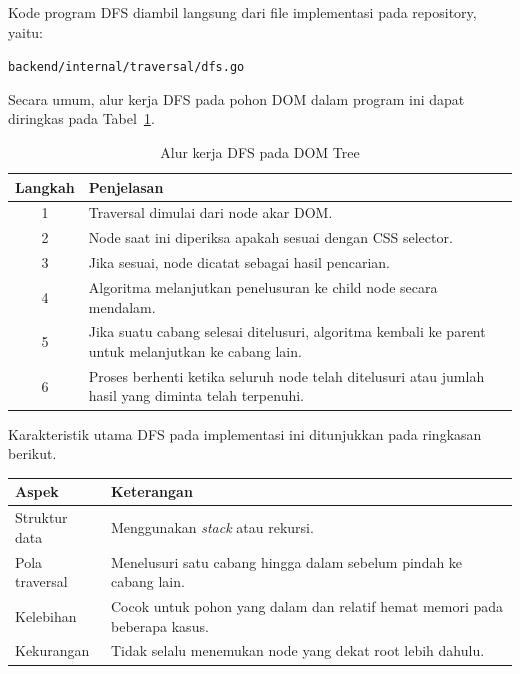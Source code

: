 Kode program DFS diambil langsung dari file implementasi pada repository, yaitu:

\begin{tcolorbox}[colback=gray!10,title=Lokasi File Implementasi DFS]
\texttt{backend/internal/traversal/dfs.go}
\end{tcolorbox}



Secara umum, alur kerja DFS pada pohon DOM dalam program ini dapat diringkas pada Tabel~\ref{tab:alur-dfs}.

\begin{table}[H]
\centering
\caption{Alur kerja DFS pada DOM Tree}
\label{tab:alur-dfs}
\begin{tabular}{|c|p{10cm}|}
\hline
\textbf{Langkah} & \textbf{Penjelasan} \\ \hline
1 & Traversal dimulai dari node akar DOM. \\ \hline
2 & Node saat ini diperiksa apakah sesuai dengan CSS selector. \\ \hline
3 & Jika sesuai, node dicatat sebagai hasil pencarian. \\ \hline
4 & Algoritma melanjutkan penelusuran ke child node secara mendalam. \\ \hline
5 & Jika suatu cabang selesai ditelusuri, algoritma kembali ke parent untuk melanjutkan ke cabang lain. \\ \hline
6 & Proses berhenti ketika seluruh node telah ditelusuri atau jumlah hasil yang diminta telah terpenuhi. \\ \hline
\end{tabular}
\end{table}

Karakteristik utama DFS pada implementasi ini ditunjukkan pada ringkasan berikut.

\begin{center}
\begin{tabular}{|l|p{8.5cm}|}
\hline
\textbf{Aspek} & \textbf{Keterangan} \\ \hline
Struktur data & Menggunakan \textit{stack} atau rekursi. \\ \hline
Pola traversal & Menelusuri satu cabang hingga dalam sebelum pindah ke cabang lain. \\ \hline
Kelebihan & Cocok untuk pohon yang dalam dan relatif hemat memori pada beberapa kasus. \\ \hline
Kekurangan & Tidak selalu menemukan node yang dekat root lebih dahulu. \\ \hline
\end{tabular}
\end{center}


